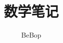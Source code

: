 \documentclass{book}
\begin{document}
    \title{数学笔记}
    \author{BeBop}
    \maketitle
    \newpage

    \tableofcontents
    \newpage
    
\end{document}
